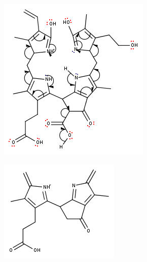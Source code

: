 \begin{figure}[!htbp]
  \begin{subfigure}[b]{0.5\textwidth}
    \includegraphics[width=\textwidth]{figures/Kapitel7/Kataboliten/fragmentation_structures/VWA_Katabolit_619_MH-CO2-RingA-RIngD_311_electronMovement.png}
    \caption{}
    \label{fig:NCC2725}
  \end{subfigure}
  \hfill
  \begin{subfigure}[b]{0.5\textwidth}
    \includegraphics[width=\textwidth]{figures/Kapitel7/Kataboliten/fragmentation_structures/VWA_Katabolit_619-CO2-RingA-RingD_311.png}

\end{subfigure}
\end{figure}
